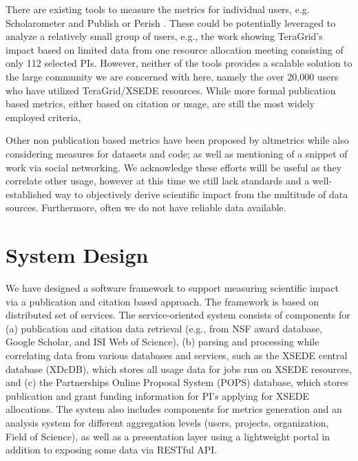 \documentclass{sig-alternate}
\begin{document}
There are existing tools to measure the metrics for individual users, e.g. Scholarometer \cite{kaur2012scholarometer} and Publish or Perish \cite{www-pop}. These could be potentially leveraged to analyze a relatively small group of users, e.g., the work \cite{bollen2011and} showing TeraGrid's impact based on limited data from one resource allocation meeting consisting of only 112 selected PIs.  However, neither of the tools provides a scalable solution to the large community we are concerned with here, namely the over 20,000 users who have utilized TeraGrid/XSEDE resources.  While more formal publication based metrics, either based on citation or usage, are still the most widely employed criteria, 

Other non publication based metrics have been proposed by altmetrics \cite{www-altmetrics} while also considering measures for datasets and code; as well as mentioning of a snippet of work via social networking. We acknowledge these efforts willl be useful as they correlate other usage, however at this time we still lack standards and a well-established way to objectively derive scientific impact from the multitude of data sources. Furthermore, often we do not have reliable data available.



\section{System Design} \label{S:design} We have designed a software framework to support measuring scientific impact via a publication and citation based approach. The framework is based on distributed set of services. The service-oriented system consists of components for (a) publication and citation data retrieval (e.g., from NSF award database, Google Scholar, and ISI Web of Science), (b) parsing and processing while correlating data from various databases and services, such as the XSEDE central database (XDcDB), which stores all usage data for jobs run on XSEDE resources, and (c) the Partnerships Online Proposal System (POPS) database, which stores publication and grant funding information for PI's applying for XSEDE allocations. The system also includes components for metrics generation and an analysis system for different aggregation levels (users, projects, organization, Field of Science), as well as a presentation layer using a lightweight portal in addition to exposing some data via RESTful API.
\end{document}

